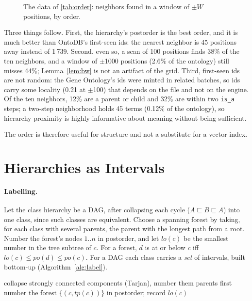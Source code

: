 \documentclass[sigconf, nonacm]{acmart}
\newcommand{\sys}{OntoDB}
\newcommand{\code}[1]{\texttt{#1}}
\begin{document}
\begin{figure}[t]
\centering

\caption{The data of \autoref{tab:order}: neighbors found in a window of $\pm W$ positions, by order.}
\label{fig:order}
\end{figure}

Three things follow. First, the hierarchy's postorder is the best order, and it is much better than \sys's first-seen ids: the nearest neighbor is 45 positions away instead of 1\,739. Second, even so, a scan of 100 positions finds 38\% of the ten neighbors, and a window of $\pm$1000 positions (2.6\% of the ontology) still misses 44\%; Lemma~\ref{lem:bw} is not an artifact of the grid. Third, first-seen ids are not random: the Gene Ontology's ids were minted in related batches, so ids carry some locality (0.21 at $\pm$100) that depends on the file and not on the engine. Of the ten neighbors, 12\% are a parent or child and 32\% are within two \code{is\_a} steps; a two-step neighborhood holds 45 terms (0.12\% of the ontology), so hierarchy proximity is highly informative about meaning without being sufficient.

The order is therefore useful for structure and not a substitute for a vector index.

\section{Hierarchies as Intervals}
\label{sec:labels}

\paragraph{Labelling.} Let the class hierarchy be a DAG, after collapsing each cycle ($A \sqsubseteq B \sqsubseteq A$) into one class, since such classes are equivalent. Choose a spanning forest by taking, for each class with several parents, the parent with the longest path from a root. Number the forest's nodes $1..n$ in postorder, and let $\mathit{lo}(c)$ be the smallest number in the tree subtree of $c$. For a forest, $d$ is at or below $c$ iff $\mathit{lo}(c)\le \mathit{po}(d)\le \mathit{po}(c)$. For a DAG each class carries a \emph{set} of intervals, built bottom-up (Algorithm~\ref{alg:label}).

\begin{algorithm}[t]
\caption{Interval sets for a class DAG}\label{alg:label}
\small
{}
collapse strongly connected components (Tarjan), number them parents first\;
number the forest $\{(c,\mathit{tp}(c))\}$ in postorder; record $\mathit{lo}(c)$\;
\end{algorithm}
\end{document}

